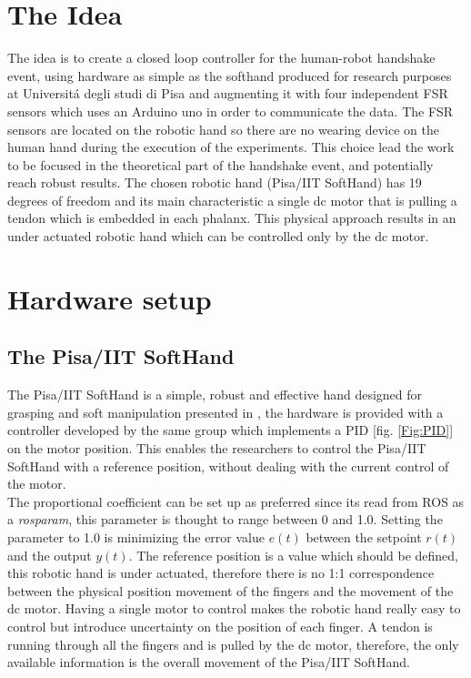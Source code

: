 \chapter{The Idea}
The idea is to create a closed loop controller for the human-robot handshake event, using hardware as simple as the softhand produced for research purposes at Universit\'a degli studi di Pisa and augmenting it with four independent FSR sensors which uses an Arduino uno in order to communicate the data.
The FSR sensors are located on the robotic hand so there are no wearing device on the human hand during the execution of the experiments.
This choice lead the work to be focused in the theoretical part of the handshake event, and potentially reach robust results. 
The chosen robotic hand (Pisa/IIT SoftHand) has 19 degrees of freedom and its main characteristic a single dc motor that is pulling a tendon which is embedded in each phalanx. This physical approach results in an under actuated robotic hand which can be controlled only by the dc motor. 

\chapter{Hardware setup}
\section{The Pisa/IIT SoftHand}
The Pisa/IIT SoftHand is a simple, robust and effective hand designed for grasping and soft manipulation presented in \cite{catalanopisa}, the hardware is provided with a controller developed by the same group which implements a PID [fig. \ref{Fig:PID}] on the motor position. This enables the researchers to control the Pisa/IIT SoftHand with a reference position, without dealing with the current control of the motor.\\
The proportional coefficient can be set up as preferred since its read from ROS as a \textit{rosparam}, this parameter is thought to range between 0 and 1.0. Setting the parameter to 1.0 is minimizing the error value $e(t)$  between the setpoint $r(t)$ and the output $y(t)$.
The reference position is a value which should be defined, this robotic hand is under actuated, therefore there is no 1:1 correspondence between the physical position movement of the fingers and the movement of the dc motor. Having a single motor to control makes the robotic hand really easy to control but introduce uncertainty on the position of each finger. A tendon is running through all the fingers and is pulled by the dc motor, therefore, the only available information is the overall movement of the Pisa/IIT SoftHand. 


